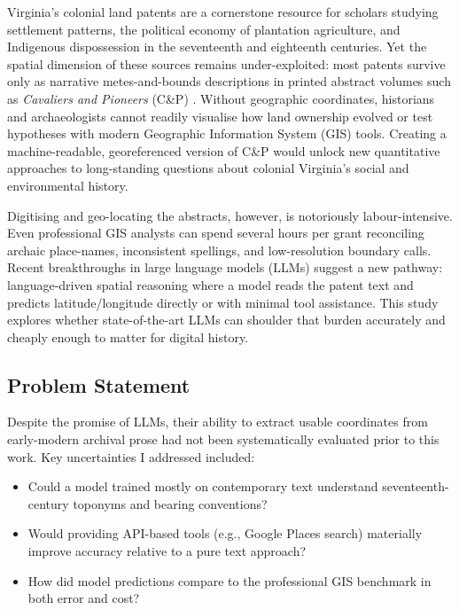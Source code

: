 Virginia's colonial land patents are a cornerstone resource for scholars
studying settlement patterns, the political economy of plantation
agriculture, and Indigenous dispossession in the seventeenth and
eighteenth centuries. Yet the spatial dimension of these sources remains
under-exploited: most patents survive only as narrative metes-and-bounds
descriptions in printed abstract volumes such as \emph{Cavaliers and
Pioneers} (C\&P) \citep{Nugent1979_cavaliers3}. Without geographic
coordinates, historians and archaeologists cannot readily visualise how
land ownership evolved or test hypotheses with modern Geographic
Information System (GIS) tools. Creating a machine-readable,
georeferenced version of C\&P would unlock new quantitative approaches
to long-standing questions about colonial Virginia's social and
environmental history.

Digitising and geo-locating the abstracts, however, is notoriously
labour-intensive. Even professional GIS analysts can spend several hours
per grant reconciling archaic place-names, inconsistent spellings, and
low-resolution boundary calls. Recent breakthroughs in large language
models (LLMs) suggest a new pathway: language-driven spatial reasoning
where a model reads the patent text and predicts latitude/longitude
directly or with minimal tool assistance. This study explores whether
state-of-the-art LLMs can shoulder that burden accurately and cheaply
enough to matter for digital history.

\subsection{Problem Statement}\label{problem-statement}

Despite the promise of LLMs, their ability to extract usable coordinates
from early-modern archival prose had not been systematically evaluated
prior to this work. Key uncertainties I addressed included:

\begin{itemize}
\tightlist
\item
  Could a model trained mostly on contemporary text understand
  seventeenth-century toponyms and bearing conventions?\\
\item
  Would providing API-based tools (e.g., Google Places search)
  materially improve accuracy relative to a pure text approach?\\
\item
  How did model predictions compare to the professional GIS benchmark in
  both error and cost?
\end{itemize}

